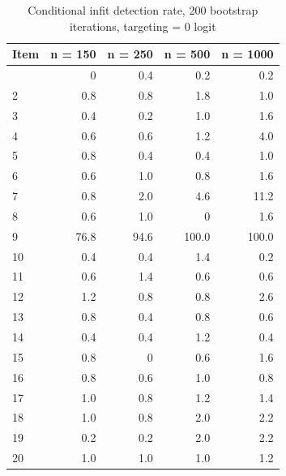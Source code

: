 \documentclass[
  letterpaper,
  DIV=11,
  numbers=noendperiod]{scrartcl}
\begin{document}
\begin{longtable}[]{@{}lrrrr@{}}

\caption{\label{tbl-ifbresults2000}Conditional infit detection rate, 200
bootstrap iterations, targeting = 0 logit}

\tabularnewline

\toprule\noalign{}
Item & n = 150 & n = 250 & n = 500 & n = 1000 \\
\midrule\noalign{}
\endhead
\bottomrule\noalign{}
\endlastfoot
1 & 0 & 0.4 & 0.2 & 0.2 \\
2 & 0.8 & 0.8 & 1.8 & 1.0 \\
3 & 0.4 & 0.2 & 1.0 & 1.6 \\
4 & 0.6 & 0.6 & 1.2 & 4.0 \\
5 & 0.8 & 0.4 & 0.4 & 1.0 \\
6 & 0.6 & 1.0 & 0.8 & 1.6 \\
7 & 0.8 & 2.0 & 4.6 & 11.2 \\
8 & 0.6 & 1.0 & 0 & 1.6 \\
9 & 76.8 & 94.6 & 100.0 & 100.0 \\
10 & 0.4 & 0.4 & 1.4 & 0.2 \\
11 & 0.6 & 1.4 & 0.6 & 0.6 \\
12 & 1.2 & 0.8 & 0.8 & 2.6 \\
13 & 0.8 & 0.4 & 0.8 & 0.6 \\
14 & 0.4 & 0.4 & 1.2 & 0.4 \\
15 & 0.8 & 0 & 0.6 & 1.6 \\
16 & 0.8 & 0.6 & 1.0 & 0.8 \\
17 & 1.0 & 0.8 & 1.2 & 1.4 \\
18 & 1.0 & 0.8 & 2.0 & 2.2 \\
19 & 0.2 & 0.2 & 2.0 & 2.2 \\
20 & 1.0 & 1.0 & 1.0 & 1.2 \\

\end{longtable}
\end{document}
